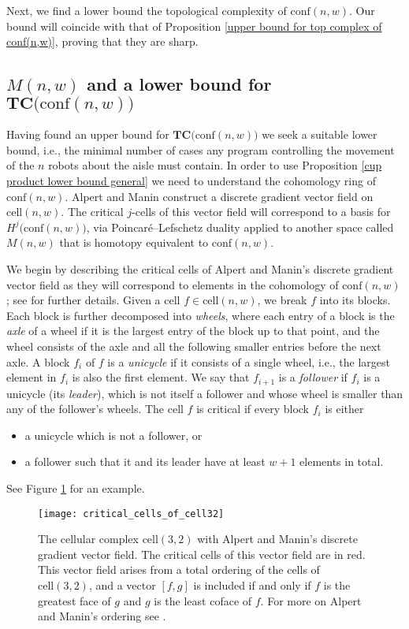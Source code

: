 Next, we find a lower bound the topological complexity of $\text{conf}(n,w)$.
Our bound will coincide with that of Proposition \ref{upper bound for top complex of conf(n,w)}, proving that they are sharp.

\subsection{$M(n,w)$ and a lower bound for $\textbf{TC}\big(\text{conf}(n,w)\big)$}
Having found an upper bound for $\textbf{TC}\big(\text{conf}(n,w)\big)$ we seek a suitable lower bound, i.e., the minimal number of cases any program controlling the movement of the $n$ robots about the aisle must contain. 
In order to use Proposition \ref{cup product lower bound general} we need to understand the cohomology ring of $\text{conf}(n,w)$.
Alpert and Manin construct a discrete gradient vector field on $\text{cell}(n,w)$. 
The critical $j$-cells of this vector field will correspond to a basis for $H^{j}\big(\text{conf}(n,w)\big)$, via Poincar\'{e}--Lefschetz duality applied to another space called $M(n,w)$ that is homotopy equivalent to $\text{conf}(n,w)$.

We begin by describing the critical cells of Alpert and Manin's discrete gradient vector field as they will correspond to elements in the cohomology of $\text{conf}(n,w)$; see \cite[Sections 3 and 4]{alpert2021configuration1} for further details.
Given a cell $f\in \text{cell}(n,w)$, we break $f$ into its blocks.
Each block is further decomposed into \emph{wheels}, where each entry of a block is the \emph{axle} of a wheel if it is the largest entry of the block up to that point, and the wheel consists of the axle and all the following smaller entries before the next axle.
A block $f_{i}$ of $f$ is a \emph{unicycle} if it consists of a single wheel, i.e., the largest element in $f_{i}$ is also the first element.
We say that $f_{i+1}$ is a \emph{follower} if $f_{i}$ is a unicycle (its \emph{leader}), which is not itself a follower and whose wheel is smaller than any of the follower's wheels.
The cell $f$ is critical if every block $f_{i}$ is either 
\begin{itemize}
\item a unicycle which is not a follower, or
\item a follower such that it and its leader have at least $w+1$ elements in total.
\end{itemize}
See Figure \ref{critical_cells_of_cell32} for an example.

\begin{figure}[h]
\centering
\captionsetup{width=.8\linewidth}
\texttt{[image: critical\_cells\_of\_cell32]}
\caption{The cellular complex $\text{cell}(3,2)$ with Alpert and Manin's discrete gradient vector field.
The critical cells of this vector field are in red.
This vector field arises from a total ordering of the cells of $\text{cell}(3,2)$, and a vector $[f, g]$ is included if and only if $f$ is the greatest face of $g$ and $g$ is the least coface of $f$.
For more on Alpert and Manin's ordering see \cite[Sections 3 and 4]{alpert2021configuration1}.
}
\label{critical_cells_of_cell32}
\end{figure}

